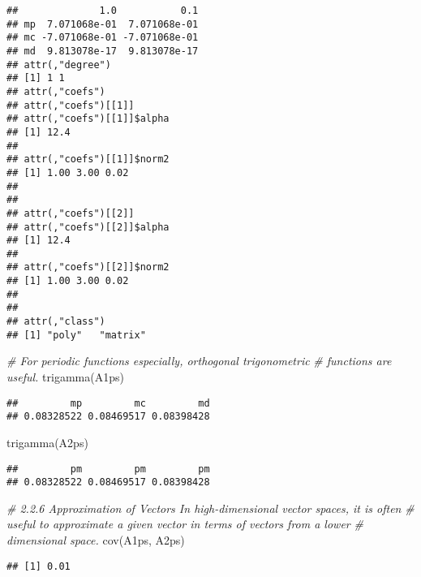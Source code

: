 \documentclass[
]{article}
\newenvironment{Shaded}{\begin{snugshade}}{\end{snugshade}}
\newcommand{\CommentTok}[1]{\textcolor[rgb]{0.56,0.35,0.01}{\textit{#1}}}
\newcommand{\FunctionTok}[1]{\textcolor[rgb]{0.00,0.00,0.00}{#1}}
\newcommand{\NormalTok}[1]{#1}
\begin{document}
\begin{verbatim}
##              1.0           0.1
## mp  7.071068e-01  7.071068e-01
## mc -7.071068e-01 -7.071068e-01
## md  9.813078e-17  9.813078e-17
## attr(,"degree")
## [1] 1 1
## attr(,"coefs")
## attr(,"coefs")[[1]]
## attr(,"coefs")[[1]]$alpha
## [1] 12.4
## 
## attr(,"coefs")[[1]]$norm2
## [1] 1.00 3.00 0.02
## 
## 
## attr(,"coefs")[[2]]
## attr(,"coefs")[[2]]$alpha
## [1] 12.4
## 
## attr(,"coefs")[[2]]$norm2
## [1] 1.00 3.00 0.02
## 
## 
## attr(,"class")
## [1] "poly"   "matrix"
\end{verbatim}

\begin{Shaded}
\begin{Highlighting}[]
\CommentTok{\# For periodic functions especially, orthogonal trigonometric }
\CommentTok{\# functions are useful.}
\FunctionTok{trigamma}\NormalTok{(A1ps)}
\end{Highlighting}
\end{Shaded}

\begin{verbatim}
##         mp         mc         md 
## 0.08328522 0.08469517 0.08398428
\end{verbatim}

\begin{Shaded}
\begin{Highlighting}[]
\FunctionTok{trigamma}\NormalTok{(A2ps)}
\end{Highlighting}
\end{Shaded}

\begin{verbatim}
##         pm         pm         pm 
## 0.08328522 0.08469517 0.08398428
\end{verbatim}

\begin{Shaded}
\begin{Highlighting}[]
\CommentTok{\# 2.2.6 Approximation of Vectors In high{-}dimensional vector spaces, it is often }
\CommentTok{\# useful to approximate a given vector in terms of vectors from a lower }
\CommentTok{\# dimensional space.}
\FunctionTok{cov}\NormalTok{(A1ps, A2ps)}
\end{Highlighting}
\end{Shaded}

\begin{verbatim}
## [1] 0.01
\end{verbatim}
\end{document}
